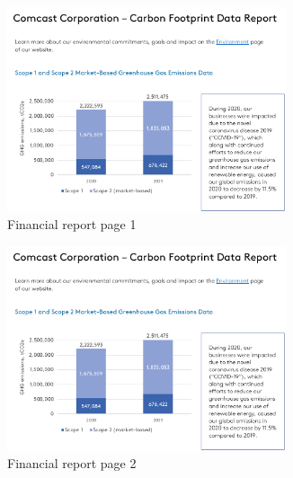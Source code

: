 \documentclass[english, 12pt, a4paper, elec, utf8, a-2b, online]{aaltothesis}
\begin{document}
\begin{figure}[h]
    \centering
    \begin{subfigure}{0.45\textwidth}
        \centering
        \includegraphics[width=0.9\textwidth]{images/ghg_emissions_bar_chart.png}
        \caption{Financial report page 1}
        \label{fig:financial_report_1}
    \end{subfigure}
    \begin{subfigure}{0.45\textwidth}
        \centering
        \includegraphics[width=0.9\textwidth]{images/ghg_emissions_bar_chart.png}
        \caption{Financial report page 2}
        \label{fig:financial_report_2}
    \end{subfigure}
    \begin{subfigure}{0.45\textwidth}
        \centering

\end{subfigure}
\end{figure}
\end{document}
